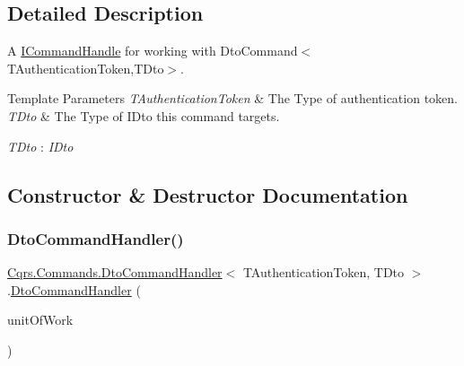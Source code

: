\subsection{Detailed Description}
A \hyperlink{interfaceCqrs_1_1Commands_1_1ICommandHandle}{I\+Command\+Handle} for working with Dto\+Command$<$\+T\+Authentication\+Token,\+T\+Dto$>$. 


\begin{DoxyTemplParams}{Template Parameters}
{\em T\+Authentication\+Token} & The Type of authentication token.\\
\hline
{\em T\+Dto} & The Type of I\+Dto this command targets.\\
\hline
\end{DoxyTemplParams}
\begin{Desc}
\item[Type Constraints]\begin{description}
\item[{\em T\+Dto} : {\em I\+Dto}]\end{description}
\end{Desc}


\subsection{Constructor \& Destructor Documentation}
\mbox{\label{classCqrs_1_1Commands_1_1DtoCommandHandler_aaff94627552cf26c503c628eb49adb60_aaff94627552cf26c503c628eb49adb60}} 
\subsubsection{\texorpdfstring{Dto\+Command\+Handler()}{DtoCommandHandler()}}
{\footnotesize\ttfamily \hyperlink{classCqrs_1_1Commands_1_1DtoCommandHandler}{Cqrs.\+Commands.\+Dto\+Command\+Handler}$<$ T\+Authentication\+Token, T\+Dto $>$.\hyperlink{classCqrs_1_1Commands_1_1DtoCommandHandler}{Dto\+Command\+Handler} (\begin{DoxyParamCaption}\item[{\hyperlink{interfaceCqrs_1_1Domain_1_1IUnitOfWork}{I\+Unit\+Of\+Work}$<$ T\+Authentication\+Token $>$}]{unit\+Of\+Work }\end{DoxyParamCaption})}



